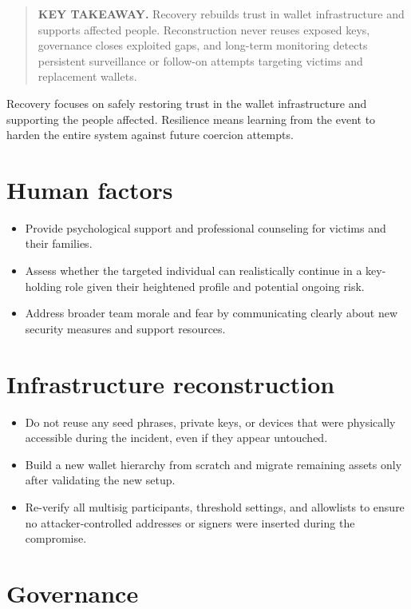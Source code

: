 \begin{quote}
\textbf{KEY TAKEAWAY.} Recovery rebuilds trust in wallet infrastructure and supports affected people. Reconstruction never reuses exposed keys, governance closes exploited gaps, and long-term monitoring detects persistent surveillance or follow-on attempts targeting victims and replacement wallets.
\end{quote}

Recovery focuses on safely restoring trust in the wallet infrastructure and supporting the people affected. Resilience means learning from the event to harden the entire system against future coercion attempts.

\section{Human factors}\label{human-factors}

\begin{itemize}
\tightlist
\item
  Provide psychological support and professional counseling for victims and their families.
\item
  Assess whether the targeted individual can realistically continue in a key-holding role given their heightened profile and potential ongoing risk.
\item
  Address broader team morale and fear by communicating clearly about new security measures and support resources.
\end{itemize}

\section{Infrastructure reconstruction}\label{infrastructure-reconstruction}

\begin{itemize}
\tightlist
\item
  Do not reuse any seed phrases, private keys, or devices that were physically accessible during the incident, even if they appear untouched.
\item
  Build a new wallet hierarchy from scratch and migrate remaining assets only after validating the new setup.
\item
  Re-verify all multisig participants, threshold settings, and allowlists to ensure no attacker-controlled addresses or signers were inserted during the compromise.
\end{itemize}

\section{Governance}\label{governance}

